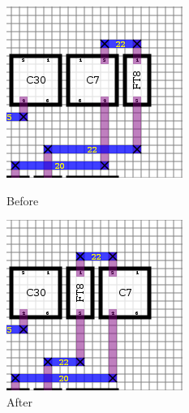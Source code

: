 \documentclass[10pt]{article}
\begin{document}
        \begin{figure}[H]
            \centering
            \begin{minipage}{.5\textwidth}
                \centering
                \includegraphics[width=0.98\linewidth]{./move_ft_before.png}
                \caption{Before}
            \end{minipage}%
            \begin{minipage}{.5\textwidth}
                \centering
                \includegraphics[width=0.98\linewidth]{./move_ft_after.png}
                \caption{After}
            \end{minipage}
        \end{figure}
\end{document}
